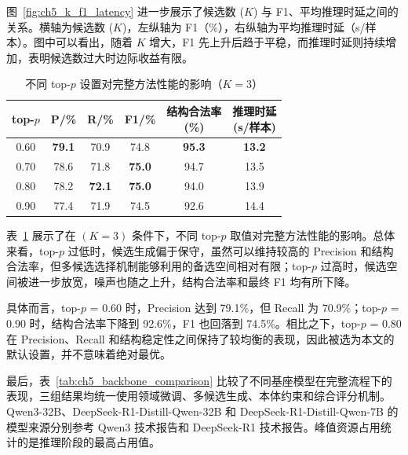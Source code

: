 图~\ref{fig:ch5_k_f1_latency} 进一步展示了候选数 ($K$) 与 F1、平均推理时延之间的关系。横轴为候选数 ($K$)，左纵轴为 F1（\%），右纵轴为平均推理时延（s/样本）。图中可以看出，随着 $K$ 增大，F1 先上升后趋于平稳，而推理时延则持续增加，表明候选数过大时边际收益有限。

\begin{table}[htbp]
  \centering
  \caption{不同 top-$p$ 设置对完整方法性能的影响（$K = 3$）}
  \label{tab:ch5_topp_impact}
  {\renewcommand{\arraystretch}{1.20}
  \footnotesize
  \setlength{\tabcolsep}{6pt}
  \begin{tabular}{@{}cccccc@{}}
    \toprule
    top-$p$ & P/\% & R/\% & F1/\% & \shortstack[c]{结构合法率\\(\%)} & \shortstack[c]{推理时延\\(s/样本)} \\
    \midrule
    0.60 & \textbf{79.1} & 70.9 & 74.8 & \textbf{95.3} & \textbf{13.2} \\
    0.70 & 78.6 & 71.8 & \textbf{75.0} & 94.7 & 13.5 \\
    0.80 & 78.2 & \textbf{72.1} & \textbf{75.0} & 94.0 & 13.9 \\
    0.90 & 77.4 & 71.9 & 74.5 & 92.6 & 14.4 \\
    \bottomrule
  \end{tabular}}
\end{table}

表~\ref{tab:ch5_topp_impact} 展示了在 $(K=3)$ 条件下，不同 top-$p$ 取值对完整方法性能的影响。总体来看，top-$p$ 过低时，候选生成偏于保守，虽然可以维持较高的 Precision 和结构合法率，但多候选选择机制能够利用的备选空间相对有限；top-$p$ 过高时，候选空间被进一步放宽，噪声也随之上升，结构合法率和最终 F1 均有所下降。

具体而言，top-$p$ = 0.60 时，Precision 达到 79.1\%，但 Recall 为 70.9\%；top-$p$ = 0.90 时，结构合法率下降到 92.6\%，F1 也回落到 74.5\%。相比之下，top-$p$ = 0.80 在 Precision、Recall 和结构稳定性之间保持了较均衡的表现，因此被选为本文的默认设置，并不意味着绝对最优。

最后，表~\ref{tab:ch5_backbone_comparison} 比较了不同基座模型在完整流程下的表现，三组结果均统一使用领域微调、多候选生成、本体约束和综合评分机制。Qwen3-32B、DeepSeek-R1-Distill-Qwen-32B 和 DeepSeek-R1-Distill-Qwen-7B 的模型来源分别参考 Qwen3 技术报告和 DeepSeek-R1 技术报告\cite{Yang2025Qwen3,Guo2025DeepSeekR1}。峰值资源占用统计的是推理阶段的最高占用值。

